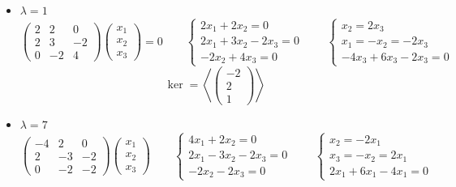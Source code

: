 \begin{itemize}
	\item $ \lambda = 1 $
    $$
    \begin{pmatrix}
    	2 & 2 & 0 \\
        2 & 3 & -2 \\
        0 & -2 & 4
    \end{pmatrix}
    \begin{pmatrix}
    	x_1 \\
        x_2 \\
        x_3
    \end{pmatrix} = 0 \qquad
    \begin{cases}
    	2x_1 + 2x_2 = 0 \\
        2x_1 + 3x_2 - 2x_3 = 0 \\
        -2x_2 + 4x_3 = 0
    \end{cases} \qquad
    \begin{cases}
    	x_2 = 2x_3 \\
        x_1 = -x_2 = -2x_3 \\
        -4x_3 + 6x_3 - 2x_3 = 0
    \end{cases} $$
    $$ \ker = \left\langle
    \begin{pmatrix}
    	-2 \\
        2 \\
        1
    \end{pmatrix} \right\rangle $$
    \item $ \lambda = 7 $
    $$
    \begin{pmatrix}
    	-4 & 2 & 0 \\
        2 & -3 & -2 \\
        0 & -2 & -2
    \end{pmatrix}
    \begin{pmatrix}
    	x_1 \\
        x_2 \\
        x_3
    \end{pmatrix} \qquad
    \begin{cases}
    	4x_1 + 2x_2 = 0 \\
        2x_1 - 3x_2 - 2x_3 = 0 \\
        -2x_2 - 2x_3 = 0
    \end{cases} \qquad
    \begin{cases}
        x_2 = -2x_1 \\
        x_3 = -x_2 = 2x_1 \\
        2x_1 + 6x_1 - 4x_1 = 0
    \end{cases} $$

\end{itemize}
